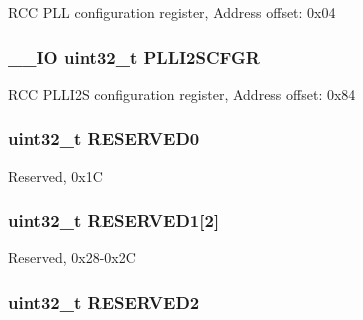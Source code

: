 R\-C\-C P\-L\-L configuration register, Address offset\-: 0x04 \hypertarget{struct_r_c_c___type_def_a2d08d5f995ed77228eb56741184a1bb6}{
\subsubsection[{P\-L\-L\-I2\-S\-C\-F\-G\-R}]{\setlength{\rightskip}{0pt plus 5cm}\-\_\-\-\_\-\-I\-O uint32\-\_\-t P\-L\-L\-I2\-S\-C\-F\-G\-R}}\label{struct_r_c_c___type_def_a2d08d5f995ed77228eb56741184a1bb6}
R\-C\-C P\-L\-L\-I2\-S configuration register, Address offset\-: 0x84 \hypertarget{struct_r_c_c___type_def_af86c61a5d38a4fc9cef942a12744486b}{
\subsubsection[{R\-E\-S\-E\-R\-V\-E\-D0}]{\setlength{\rightskip}{0pt plus 5cm}uint32\-\_\-t R\-E\-S\-E\-R\-V\-E\-D0}}\label{struct_r_c_c___type_def_af86c61a5d38a4fc9cef942a12744486b}
Reserved, 0x1\-C \hypertarget{struct_r_c_c___type_def_a28d88d9a08aab1adbebea61c42ef901e}{
\subsubsection[{R\-E\-S\-E\-R\-V\-E\-D1}]{\setlength{\rightskip}{0pt plus 5cm}uint32\-\_\-t R\-E\-S\-E\-R\-V\-E\-D1\mbox{[}2\mbox{]}}}\label{struct_r_c_c___type_def_a28d88d9a08aab1adbebea61c42ef901e}
Reserved, 0x28-\/0x2\-C \hypertarget{struct_r_c_c___type_def_a4c9b972a304c0e08ca27cbe57627c496}{
\subsubsection[{R\-E\-S\-E\-R\-V\-E\-D2}]{\setlength{\rightskip}{0pt plus 5cm}uint32\-\_\-t R\-E\-S\-E\-R\-V\-E\-D2}}\label{struct_r_c_c___type_def_a4c9b972a304c0e08ca27cbe57627c496}
